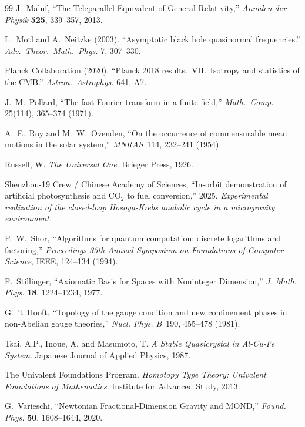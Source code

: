\documentclass[12pt,oneside]{book}
\begin{document}
\begin{thebibliography}{99}
J.~Maluf, ``The Teleparallel Equivalent of General Relativity,'' \emph{Annalen der Physik} \textbf{525}, 339--357, 2013.

L.~Motl and A.~Neitzke (2003).
``Asymptotic black hole quasinormal frequencies.''
\textit{Adv.\ Theor.\ Math.\ Phys.} 7, 307--330.

Planck Collaboration (2020).
``Planck 2018 results.\ VII.\ Isotropy and statistics of the CMB.''
\textit{Astron.\ Astrophys.} 641, A7.

J.~M.~Pollard,
``The fast Fourier transform in a finite field,''
\emph{Math.\ Comp.} 25(114), 365--374 (1971).

A.~E.~Roy and M.~W.~Ovenden, ``On the occurrence of commensurable mean motions in the solar system,'' \emph{MNRAS}\ 114, 232--241 (1954).

Russell, W.
\newblock \emph{The Universal One}.
\newblock Brieger Press, 1926.

Shenzhou-19 Crew / Chinese Academy of Sciences,
``In-orbit demonstration of artificial photosynthesis and $\text{CO}_2$ to fuel conversion,''
2025.
\textit{Experimental realization of the closed-loop Hosoya-Krebs anabolic cycle in a microgravity environment.}

P.~W.~Shor,
``Algorithms for quantum computation: discrete logarithms and factoring,''
\emph{Proceedings 35th Annual Symposium on Foundations of Computer Science}, IEEE, 124--134 (1994).

F.~Stillinger, ``Axiomatic Basis for Spaces with Noninteger Dimension,'' \emph{J. Math. Phys.} \textbf{18}, 1224--1234, 1977.

G.~'t~Hooft,
``Topology of the gauge condition and new confinement phases in non-Abelian gauge theories,''
\emph{Nucl. Phys. B}\ 190, 455--478 (1981).

Tsai, A.P., Inoue, A. and Masumoto, T.
\newblock \emph{A Stable Quasicrystal in Al-Cu-Fe System}.
\newblock Japanese Journal of Applied Physics, 1987.

The Univalent Foundations Program.
\newblock \emph{Homotopy Type Theory: Univalent Foundations of Mathematics}.
\newblock Institute for Advanced Study, 2013.

G.~Varieschi, ``Newtonian Fractional-Dimension Gravity and MOND,'' \emph{Found. Phys.} \textbf{50}, 1608--1644, 2020.


\end{thebibliography}
\end{document}
